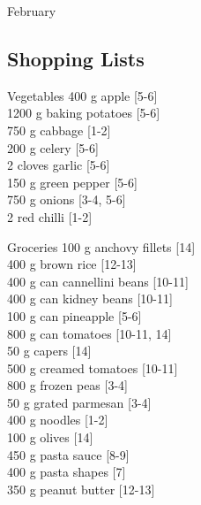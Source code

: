 \begin{menu}{February}
    \subsection*{Shopping Lists}
      \begin{shoppinglist}{Vegetables}
      400 g apple 
        {\scriptsize[5-6]}\\
      1200 g baking potatoes 
        {\scriptsize[5-6]}\\
      750 g cabbage 
        {\scriptsize[1-2]}\\
      200 g celery 
        {\scriptsize[5-6]}\\
      2 cloves garlic 
        {\scriptsize[5-6]}\\
      150 g green pepper 
        {\scriptsize[5-6]}\\
      750 g onions 
        {\scriptsize[3-4, 5-6]}\\
      2  red chilli 
        {\scriptsize[1-2]}\\
      \end{shoppinglist}%
      \begin{shoppinglist}{Groceries}
      100 g anchovy fillets 
        {\scriptsize[14]}\\
      400 g brown rice 
        {\scriptsize[12-13]}\\
      400 g can cannellini beans 
        {\scriptsize[10-11]}\\
      400 g can kidney beans 
        {\scriptsize[10-11]}\\
      100 g can pineapple 
        {\scriptsize[5-6]}\\
      800 g can tomatoes 
        {\scriptsize[10-11, 14]}\\
      50 g capers 
        {\scriptsize[14]}\\
      500 g creamed tomatoes 
        {\scriptsize[10-11]}\\
      800 g frozen peas 
        {\scriptsize[3-4]}\\
      50 g grated parmesan 
        {\scriptsize[3-4]}\\
      400 g noodles 
        {\scriptsize[1-2]}\\
      100 g olives 
        {\scriptsize[14]}\\
      450 g pasta sauce 
        {\scriptsize[8-9]}\\
      400 g pasta shapes 
        {\scriptsize[7]}\\
      350 g peanut butter 
        {\scriptsize[12-13]}\\

\end{shoppinglist}
\end{menu}
